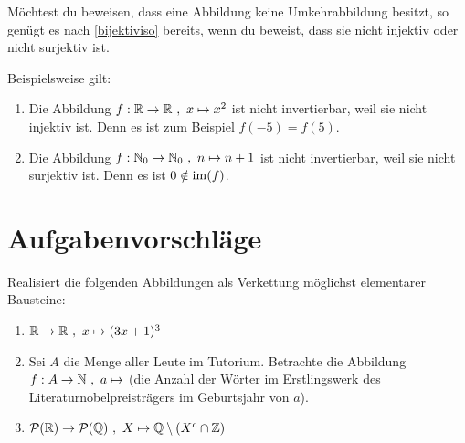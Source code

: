 \begin{bem} \label{invwiderleg}
    Möchtest du beweisen, dass eine Abbildung keine Umkehrabbildung besitzt, so genügt es nach \cref{bijektiviso} bereits, wenn du beweist, dass sie nicht injektiv oder nicht surjektiv ist.
\end{bem}


\begin{bsp}
    Beispielsweise gilt:
    \begin{enumerate}
        \item Die Abbildung $f : \R \to \R \ ,\ x\mapsto x^2$ ist nicht invertierbar, weil sie nicht injektiv ist. Denn es ist zum Beispiel $f(-5)=f(5)$.
        \item Die Abbildung $f : \mathbb N_0 \to \mathbb N_0 \ ,\ n \mapsto n+1$ ist nicht invertierbar, weil sie nicht surjektiv ist. Denn es ist $0\notin \operatorname{im}(f)$.
    \end{enumerate}
\end{bsp}





\clearpage
\section{Aufgabenvorschläge}


\begin{aufg}
    Realisiert die folgenden Abbildungen als Verkettung möglichst elementarer Bausteine:
    \begin{enumerate}
        \item $\mathbb R\to \mathbb R \ ,\ x\mapsto (3x+1)^3$
        \item Sei $A$ die Menge aller Leute im Tutorium. Betrachte die Abbildung $f:A\to \mathbb N \ ,\ a\mapsto$ (die Anzahl der Wörter im Erstlingswerk des Literaturnobelpreisträgers im Geburtsjahr von $a$).
        \item $\mathcal P(\mathbb R) \to \mathcal P(\mathbb Q) \ ,\ X \mapsto \mathbb Q \setminus (X^c\cap \mathbb Z)$
    \end{enumerate}
\end{aufg}


